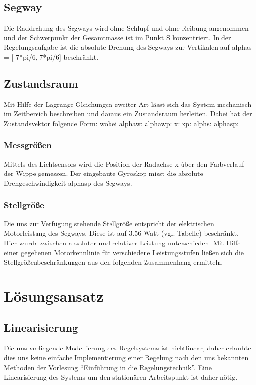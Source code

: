 \documentclass[pdf]{ifacconf}
\begin{document}
	\subsection{Segway}
	Die Raddrehung des Segways wird ohne Schlupf und ohne Reibung angenommen und der Schwerpunkt der Gesamtmasse ist im Punkt S konzentriert. 
	In der Regelungsaufgabe ist die absolute Drehung des Segways zur Vertikalen auf alphas = [-7*pi/6, 7*pi/6] beschränkt. %

	\subsection{Zustandsraum}
	Mit Hilfe der Lagrange-Gleichungen zweiter Art lässt sich das System mechanisch im Zeitbereich beschreiben und daraus ein Zustandsraum herleiten.
	Dabei hat der Zustandsvektor folgende Form:
	wobei alphaw: 
	alphawp:
	x:
	xp:
	alphs:
	alphasp:
	
		\subsubsection{Messgrößen}
		Mittels des Lichtsensors wird die Position der Radachse x über den Farbverlauf der Wippe gemessen. Der eingebaute Gyroskop misst die absolute Drehgeschwindigkeit alphasp des Segways.
		
		\subsubsection{Stellgröße}
		Die uns zur Verfügung stehende Stellgröße entspricht der elektrischen Motorleistung des Segways. Diese ist auf 3.56 Watt (vgl. Tabelle) beschränkt.
		Hier wurde zwischen absoluter und relativer Leistung unterschieden. Mit Hilfe einer gegebenen Motorkennlinie für verschiedene Leistungsstufen ließen sich die Stellgrößenbeschränkungen aus den folgenden Zusammenhang ermitteln.

	
\section{Lösungsansatz}

	\subsection{Linearisierung}
	Die uns vorliegende Modellierung des Regelsystems ist nichtlinear, daher erlaubte dies uns keine einfache Implementierung einer Regelung nach den uns bekannten Methoden der Vorlesung ``Einführung in die Regelungstechnik''. 
	Eine Linearisierung des Systems um den stationären Arbeitspunkt ist daher nötig.
\end{document}
